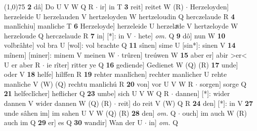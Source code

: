 \documentclass[8pt,a4paper,notitlepage]{article}
\begin{document}
\begin{table}[ht]
\begin{minipage}[t]{0.5\linewidth}
\line(1,0){75} \newline
\textbf{2} dâ] Do U V W Q R  $\cdot$ ir] in T \textbf{3} reit] reitet W (R)  $\cdot$ Herzeloyden] herzeleide U herzelauden V hertzeloyden W hertzeloudin Q herczelaude R \textbf{4} manlîchiu] manliche T \textbf{6} Herzeloyde] herzeleide U herzelaͮde V hertzeloyde W herzeloude Q herczelaude R \textbf{7} in] [*]: in V  $\cdot$ hete] \textit{om.} Q \textbf{9} dô] nun W \textbf{10} volbrâhte] vol bra U [wol]: vol brachte Q \textbf{11} sînen] sime U [sin*]: sinen V \textbf{14} mînem] [miner]: minem V meinen W  $\cdot$ trûren] treúwen W \textbf{15} aber er] abir >er< U er aber R  $\cdot$ ie rîter] ritter ye Q \textbf{16} gediende] Gedienet W (Q) (R) \textbf{17} unde] oder V \textbf{18} helfe] hilffen R \textbf{19} rehter manlîchen] rechter manlicher U rehte manliche V (W) (Q) rechtu manlichú R \textbf{20} von] vor U V W R  $\cdot$ sorgen] sorge Q \textbf{21} helfeclîcher] heflicher Q \textbf{23} umbe] sich U V W Q R  $\cdot$ dannen] [*]: wider dannen V wider dannen W (Q) (R)  $\cdot$ reit] do reit V (W) Q R \textbf{24} den] [*]: in V \textbf{27} unde sâhen im] im sahen U V W (Q) (R) \textbf{28} den] \textit{om.} Q  $\cdot$ ouch] im auch W (R) auch im Q \textbf{29} er] es Q \textbf{30} wandir] Wan der U  $\cdot$ in] \textit{om.} Q \newline
\end{minipage}
\end{table}
\end{document}
